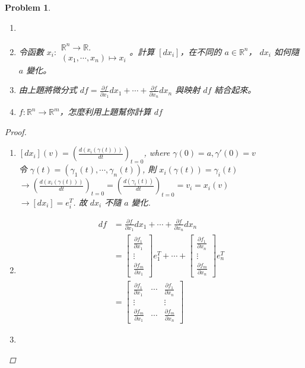 \documentclass[10pt,a4paper]{article}
\newcounter{theProblemCounter}
\newtheorem{problem}[theProblemCounter]{Problem}
\begin{document}
\setcounter{theProblemCounter}{7}
\begin{problem}
\begin{enumerate}
\item[]
\item[(a)] 令函數 $x_i:\begin{array}{c}\mathbb{R}^n\to \mathbb{R}.\\ (x_1,\cdots, x_n)\mapsto x_i\end{array}$。計算 $[dx_i]$，在不同的 $a\in \mathbb{R}^n$， $dx_i$ 如何隨 $a$ 變化。
\item[(b)] 由上題將微分式 $df=\frac{\partial f}{\partial x_1} dx_1 + \cdots + \frac{\partial f}{\partial x_n} dx_n$ 與映射 $df$ 結合起來。
\item[(c)] $f:\mathbb{R}^n\to \mathbb{R}^m$，怎麼利用上題幫你計算 $df$
\end{enumerate}
\begin{proof}
\begin{enumerate}
\item[(a)]
$[dx_i](v)=\left(\frac{d(x_i(\gamma(t)))}{dt}\right)_{t=0}$, where $\gamma(0)=a, \gamma'(0)=v$\\
令 $\gamma(t)=\left(\gamma_1(t),\cdots,\gamma_n(t)\right)$, 則 $x_i(\gamma(t))=\gamma_i(t)$\\
$\rightarrow \left(\frac{d(x_i(\gamma(t)))}{dt}\right)_{t=0}=\left(\frac{d(\gamma_i(t))}{dt}\right)_{t=0}=v_i=x_i(v)$\\
$\rightarrow [dx_i]=e_i^T$.
故 $dx_i$ 不隨 $a$ 變化.
\item[(b)]
\begin{align*}
df&=\frac{\partial f}{\partial x_1} dx_1 + \cdots + \frac{\partial f}{\partial x_n} dx_n\\
&=\begin{bmatrix}\frac{\partial f_1}{\partial x_1}\\ \vdots \\ \frac{\partial f_m}{\partial x_1}\end{bmatrix}e_1^T + \cdots + \begin{bmatrix}\frac{\partial f_1}{\partial x_n}\\ \vdots \\ \frac{\partial f_m}{\partial x_n}\end{bmatrix}e_n^T\\
&=\begin{bmatrix}\frac{\partial f_1}{\partial x_1} & \cdots & \frac{\partial f_1}{\partial x_n}\\ \vdots& &\vdots \\ \frac{\partial f_m}{\partial x_1} & \cdots & \frac{\partial f_m}{\partial x_n}\end{bmatrix}
\end{align*}
\item[(c)]
\end{enumerate}
\end{proof}
\end{problem}
\end{document}
